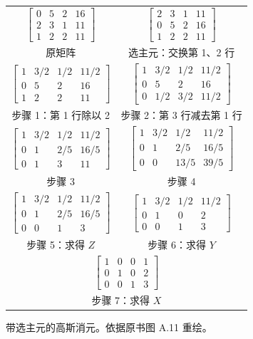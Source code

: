 \begin{figure}[htbp]
  \centering
  \scriptsize
  \renewcommand{\arraystretch}{1.15}
  \begin{tabular}{c@{\ $\Longrightarrow$\ }c}
    $\left[\begin{array}{ccc|c}0&5&2&16\\2&3&1&11\\1&2&2&11\end{array}\right]$
      & $\left[\begin{array}{ccc|c}2&3&1&11\\0&5&2&16\\1&2&2&11\end{array}\right]$\\
    原矩阵 & 选主元：交换第 1、2 行\\[0.5em]
    $\left[\begin{array}{ccc|c}1&3/2&1/2&11/2\\0&5&2&16\\1&2&2&11\end{array}\right]$
      & $\left[\begin{array}{ccc|c}1&3/2&1/2&11/2\\0&5&2&16\\0&1/2&3/2&11/2\end{array}\right]$\\
    步骤 1：第 1 行除以 2 & 步骤 2：第 3 行减去第 1 行\\[0.5em]
    $\left[\begin{array}{ccc|c}1&3/2&1/2&11/2\\0&1&2/5&16/5\\0&1&3&11\end{array}\right]$
      & $\left[\begin{array}{ccc|c}1&3/2&1/2&11/2\\0&1&2/5&16/5\\0&0&13/5&39/5\end{array}\right]$\\
    步骤 3 & 步骤 4\\[0.5em]
    $\left[\begin{array}{ccc|c}1&3/2&1/2&11/2\\0&1&2/5&16/5\\0&0&1&3\end{array}\right]$
      & $\left[\begin{array}{ccc|c}1&3/2&1/2&11/2\\0&1&0&2\\0&0&1&3\end{array}\right]$\\
    步骤 5：求得 $Z$ & 步骤 6：求得 $Y$\\[0.5em]
    \multicolumn{2}{c}{$\left[\begin{array}{ccc|c}1&0&0&1\\0&1&0&2\\0&0&1&3\end{array}\right]$}\\
    \multicolumn{2}{c}{步骤 7：求得 $X$}
  \end{tabular}
  \caption{带选主元的高斯消元。依据原书图 A.11 重绘。}
  \label{fig:a-11}
\end{figure}

